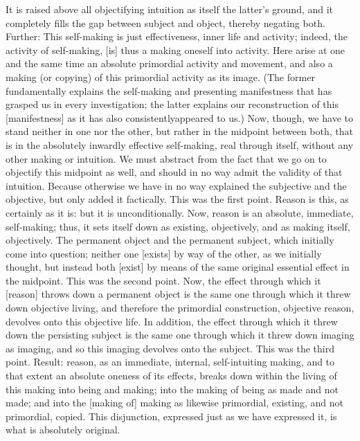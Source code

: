It is raised above all objectifying intuition
as itself the latter’s ground,
and it completely fills the gap
between subject and object,
thereby negating both.
Further:
This self-making is just effectiveness,
inner life and activity;
indeed, the activity of self-making, [is]
thus a making oneself into activity.
Here arise at one and the same time
an absolute primordial activity and movement,
and also a making (or copying) of
this primordial activity as its image.
(The former fundamentally explains
the self-making and presenting manifestness
that has grasped us in every investigation;
the latter explains our reconstruction
of this [manifestness]
as it has also consistentlyappeared to us.)
Now, though, we have to stand
neither in one nor the other,
but rather in the midpoint between both,
that is in the absolutely inwardly
effective self-making,
real through itself,
without any other making or intuition.
We must abstract from the fact
that we go on to objectify
this midpoint as well,
and should in no way admit
the validity of that intuition.
Because otherwise we have in no way
explained the subjective and the objective,
but only added it factically.
This was the first point.
Reason is this, as certainly as it is:
but it is unconditionally.
Now, reason is an absolute, immediate, self-making;
thus, it sets itself down as existing, objectively,
and as making itself, objectively.
The permanent object and the permanent subject,
which initially come into question;
neither one [exists] by way of the other,
as we initially thought,
but instead both [exist] by means of
the same original essential effect in the midpoint.
This was the second point.
Now, the effect through which
it [reason] throws down a permanent object is
the same one through which it threw down objective living,
and therefore the primordial construction,
objective reason, devolves onto this objective life.
In addition, the effect through which
it threw down the persisting subject is
the same one through which it threw down imaging as imaging,
and so this imaging devolves onto the subject.
This was the third point.
Result:
reason, as an immediate, internal, self-intuiting making,
and to that extent an absolute oneness of its effects,
breaks down within the living of this making
into being and making;
into the making of being as made and not made;
and into the [making of] making
as likewise primordial, existing,
and not primordial, copied.
This disjunction, expressed just as we have expressed it,
is what is absolutely original.


